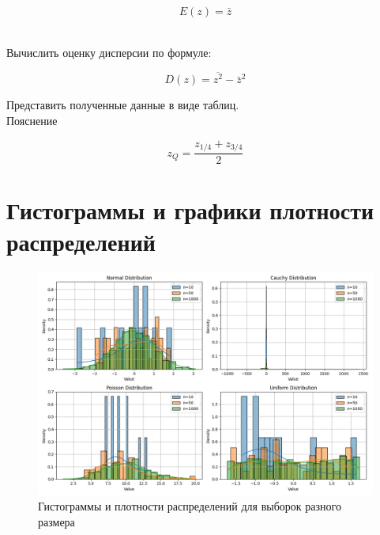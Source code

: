 \documentclass[a4paper]{article}
\begin{document}
    $$
    E(z)=\bar{z}
    $$


    \\  Вычислить оценку дисперсии по формуле:

    $$
    D(z)=\overline{z^2}-\bar{z}^2
    $$


    Представить полученные данные в виде таблиц.
    \\ Пояснение

    $$
    z_Q=\frac{z_{1 / 4}+z_{3 / 4}}{2}
    $$


    \section{Гистограммы и графики плотности распределений}\label{sec:----}
    \begin{figure}[H]
        \centering
        \includegraphics[width=1\textwidth]{histograms} %
        \caption{Гистограммы и плотности распределений для выборок разного размера}\label{fig:figure}
    \end{figure}

    \newpage
\end{document}
